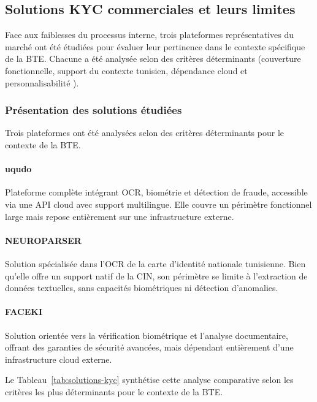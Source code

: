 \subsection{Solutions KYC commerciales et leurs limites}
\label{subsec:solutions-commerciales}

Face aux faiblesses du processus interne, trois plateformes représentatives du marché ont été étudiées pour évaluer leur pertinence dans le contexte spécifique de la BTE. Chacune a été analysée selon des critères déterminants (couverture fonctionnelle, support du contexte tunisien, dépendance cloud et personnalisabilité ).

\subsubsection{Présentation des solutions étudiées}

Trois plateformes ont été analysées selon des critères déterminants pour le contexte de la BTE.

\paragraph{uqudo~\cite{uqudo2026}}
Plateforme complète intégrant OCR, biométrie et détection de fraude, accessible via une API cloud avec support multilingue. Elle couvre un périmètre fonctionnel large mais repose entièrement sur une infrastructure externe.

\paragraph{NEUROPARSER~\cite{neuroparser2026}}
Solution spécialisée dans l'OCR de la carte d'identité nationale tunisienne. Bien qu'elle offre un support natif de la CIN, son périmètre se limite à l'extraction de données textuelles, sans capacités biométriques ni détection d'anomalies.

\paragraph{FACEKI~\cite{faceki2026}}
Solution orientée vers la vérification biométrique et l'analyse documentaire, offrant des garanties de sécurité avancées, mais dépendant entièrement d'une infrastructure cloud externe.

Le Tableau~\ref{tab:solutions-kyc} synthétise cette analyse comparative selon les critères les plus déterminants pour le contexte de la BTE.

